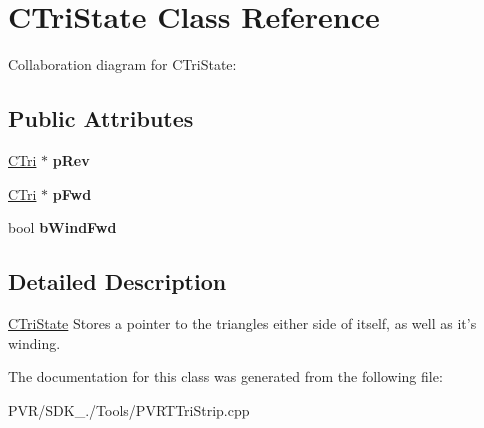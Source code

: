 \hypertarget{class_c_tri_state}{\section{C\+Tri\+State Class Reference}
\label{class_c_tri_state}
}


Collaboration diagram for C\+Tri\+State\+:
\subsection*{Public Attributes}
\begin{DoxyCompactItemize}
\item 
\hypertarget{class_c_tri_state_ab245afa7f1aab94d13685d98913eaf32}{\hyperlink{class_c_tri}{C\+Tri} $\ast$ {\bfseries p\+Rev}}\label{class_c_tri_state_ab245afa7f1aab94d13685d98913eaf32}

\item 
\hypertarget{class_c_tri_state_a7fac7b71f5656a34c85bcaaceed07970}{\hyperlink{class_c_tri}{C\+Tri} $\ast$ {\bfseries p\+Fwd}}\label{class_c_tri_state_a7fac7b71f5656a34c85bcaaceed07970}

\item 
\hypertarget{class_c_tri_state_a4d45abf7165b80638a1a1a0247d56dcc}{bool {\bfseries b\+Wind\+Fwd}}\label{class_c_tri_state_a4d45abf7165b80638a1a1a0247d56dcc}

\end{DoxyCompactItemize}


\subsection{Detailed Description}


  \hyperlink{class_c_tri_state}{C\+Tri\+State}  Stores a pointer to the triangles either side of itself, as well as it's winding. 

The documentation for this class was generated from the following file\+:\begin{DoxyCompactItemize}
\item 
P\+V\+R/\+S\+D\+K\+\_./\+Tools/P\+V\+R\+T\+Tri\+Strip.\+cpp\end{DoxyCompactItemize}

